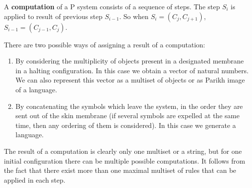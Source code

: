 A {\bf computation} of a P system consists of a sequence of steps. The step $S_i$ is applied to result of previous step $S_{i-1}$. So when $S_i = (C_j,C_{j+1})$, $S_{i-1} = (C_{j-1},C_j)$.


There are two possible ways of assigning a result of a computation:

\begin{enumerate}
    \item By considering the multiplicity of objects present in a designated membrane in a halting configuration. In this case we obtain a vector of natural numbers. We can also represent this vector as a multiset of objects or as Parikh image of a language.
    \item By concatenating the symbols which leave the system, in the order they are sent out of the skin membrane (if several symbols are expelled at the same time, then any ordering of them is considered). In this case we generate a language.
\end{enumerate}

The result of a computation is clearly only one multiset or a string, but for one initial configuration there can be multiple possible computations. It follows from the fact that there exist more than one maximal multiset of rules that can be applied in each step.
